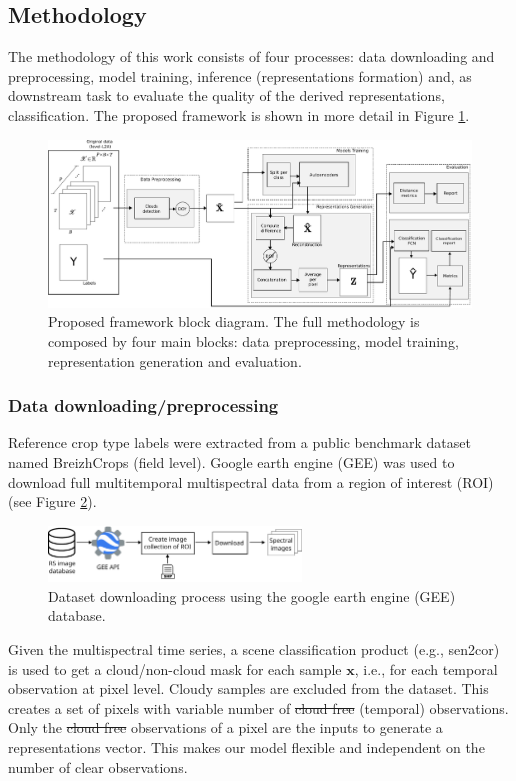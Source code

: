 \documentclass[journal,article,submit,pdftex,moreauthors]{Definitions/mdpi}
\providecommand{\DIFadd}[1]{{\protect\color{blue}\uwave{#1}}} %
\providecommand{\DIFdel}[1]{{\protect\color{red}\sout{#1}}}                      %
\providecommand{\DIFaddbegin}{} %
\providecommand{\DIFaddend}{} %
\providecommand{\DIFdelbegin}{} %
\providecommand{\DIFdelend}{} %
\begin{document}
\subsection{Methodology}
The methodology of this work consists of four processes: data downloading and preprocessing, model training, inference (representations formation) and, as downstream task to evaluate the quality of the derived representations, classification. The proposed framework is shown in more detail in Figure \ref{abstract}.
\begin{figure}[H]
	\centering
	\includegraphics[width=\textwidth]{figures/abstract.pdf}
	\caption{Proposed framework block diagram. The full methodology is composed by four main blocks: data preprocessing, model training, representation generation and evaluation.} 
	\label{abstract}
\end{figure}
\subsubsection{Data downloading/preprocessing}\label{data_preprocessing}
Reference crop type labels were extracted from a public benchmark dataset named BreizhCrops \cite{Russwurm2020} (field level).
Google earth engine (GEE) was used to download full multitemporal multispectral data from a region of interest (ROI) (see Figure \ref{GEE_process}). \\
\begin{figure}[H]
	\centering
	\includegraphics[width=0.6\textwidth]{figures/gee_download.pdf}
	\caption{Dataset downloading process using the google earth engine (GEE) database.}
	\label{GEE_process}    
\end{figure}

Given the multispectral time series, a scene classification product (e.g., \DIFaddbegin \DIFadd{ESAs }\DIFaddend sen2cor) is used to get a cloud/non-cloud mask for each sample $\mathbf{x}$, i.e., for each temporal observation at pixel level.
Cloudy samples are excluded from the dataset. This creates a set of pixels with variable number of \DIFdelbegin \DIFdel{cloud free }\DIFdelend \DIFaddbegin \DIFadd{cloud-free }\DIFaddend (temporal) observations. Only the \DIFdelbegin \DIFdel{cloud free }\DIFdelend \DIFaddbegin \DIFadd{cloud-free }\DIFaddend observations of a pixel are the inputs to generate a representations vector. This makes our model flexible and independent on the number of clear observations.
\end{document}
